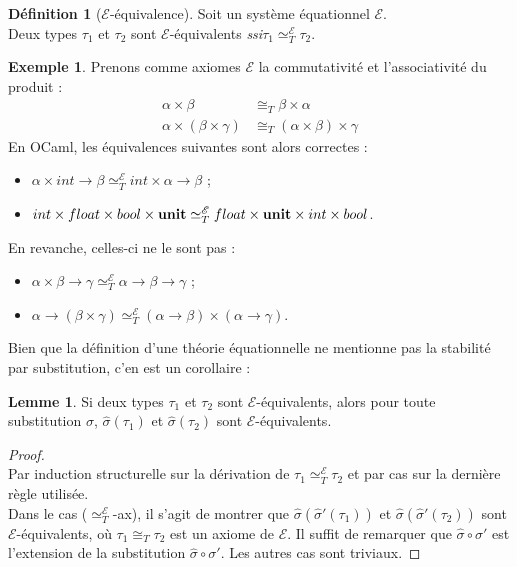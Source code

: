 \documentclass[a4paper]{report}
\newenvironment{preuve} 
	{\begin{proof}~\\} 
	{\end{proof}}
\theoremstyle{definition}
\newtheorem{definition}[theoreme]{Définition}
\newtheorem{lemme}[theoreme]{Lemme}
\newtheorem{exemple}[theoreme]{Exemple}
\newcommand{\ssi}{\textit{ssi}\xspace}
\newcommand{\unit}{\bold{unit}}
\newcommand{\E}{\mathscr E}
\newcommand{\Tiso}{\cong_T}
\newcommand{\Tequiv}{\simeq_T}
\newcommand{\TEequiv}{\Tequiv^\E}
\begin{document}
\begin{definition}[$\E$-équivalence]
	Soit un système équationnel $\E$. \\
	Deux types $\tau_1$ et $\tau_2$ sont $\E$-équivalents \ssi $\tau_1 \TEequiv \tau_2$.
\end{definition}

\begin{exemple}
	Prenons comme axiomes $\E$ la commutativité et l'associativité du produit :
	\begin{align}
			\alpha \times \beta &\Tiso
			\beta \times \alpha
			\tag{$\times$-comm}
		\\
			\alpha \times (\beta \times \gamma) &\Tiso
			(\alpha \times \beta) \times \gamma
			\tag{$\times$-assoc}
	\end{align}
	En OCaml, les équivalences suivantes sont alors correctes :
	\begin{itemize}
		\item $\alpha \times int \rightarrow \beta \TEequiv int \times \alpha \rightarrow \beta$ ;
		\item $int \times float \times bool \times \unit \TEequiv float \times \unit \times int \times bool$.
	\end{itemize}
	En revanche, celles-ci ne le sont pas :
	\begin{itemize}
		\item $\alpha \times \beta \rightarrow \gamma \TEequiv \alpha \rightarrow \beta \rightarrow \gamma$ ;
		\item $\alpha \rightarrow (\beta \times \gamma) \TEequiv (\alpha \rightarrow \beta) \times (\alpha \rightarrow \gamma)$.
	\end{itemize}
\end{exemple}

Bien que la définition d'une théorie équationnelle ne mentionne pas la stabilité par substitution, c'en est un corollaire :

\begin{lemme}
	Si deux types $\tau_1$ et $\tau_2$ sont $\E$-équivalents, alors pour toute substitution $\sigma$, $\hat \sigma (\tau_1)$ et $\hat \sigma (\tau_2)$ sont $\E$-équivalents.
\end{lemme}

\begin{preuve}
	Par induction structurelle sur la dérivation de $\tau_1 \TEequiv \tau_2$ et par cas sur la dernière règle utilisée. \\
	Dans le cas ($\TEequiv$-ax), il s'agit de montrer que $\hat \sigma (\hat \sigma' (\tau_1))$ et $\hat \sigma (\hat \sigma' (\tau_2))$ sont $\E$-équivalents, où $\tau_1 \Tiso \tau_2$ est un axiome de $\E$. Il suffit de remarquer que $\hat \sigma \circ \hat \sigma'$ est l'extension de la substitution $\hat \sigma \circ \sigma'$.	Les autres cas sont triviaux.
\end{preuve}
\end{document}
